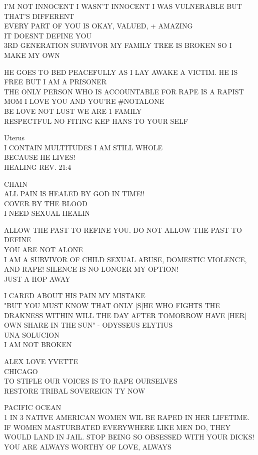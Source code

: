 \documentclass[10pt,letterpaper]{article}
\begin{document}
I'M NOT INNOCENT I WASN'T INNOCENT I WAS VULNERABLE BUT THAT'S DIFFERENT\\
EVERY PART OF YOU IS OKAY, VALUED, + AMAZING\\
IT DOESNT DEFINE YOU\\
3RD GENERATION SURVIVOR MY FAMILY TREE IS BROKEN SO I MAKE MY OWN

HE GOES TO BED PEACEFULLY AS I LAY AWAKE A VICTIM.  HE IS FREE BUT I AM A PRISONER\\
THE ONLY PERSON WHO IS ACCOUNTABLE FOR RAPE IS A RAPIST MOM I LOVE YOU AND YOU'RE \#NOTALONE\\
BE LOVE NOT LUST WE ARE 1 FAMILY\\
RESPECTFUL NO FITING KEP HANS TO YOUR SELF

Uterus\\
I CONTAIN MULTITUDES I AM STILL WHOLE\\
BECAUSE HE LIVES!\\
HEALING REV. 21:4

CHAIN\\
ALL PAIN IS HEALED BY GOD IN TIME!!\\
COVER BY THE BLOOD\\
I NEED SEXUAL HEALIN

ALLOW THE PAST TO REFINE YOU.  DO NOT ALLOW THE PAST TO DEFINE\\
YOU ARE NOT ALONE\\
I AM A SURVIVOR OF CHILD SEXUAL ABUSE, DOMESTIC VIOLENCE, AND RAPE!  SILENCE IS NO LONGER MY OPTION!\\
JUST A HOP AWAY

I CARED ABOUT HIS PAIN MY MISTAKE\\
"BUT YOU MUST KNOW THAT ONLY {[}S{]}HE WHO FIGHTS THE DRAKNESS WITHIN WILL THE DAY AFTER TOMORROW HAVE {[}HER{]} OWN SHARE IN THE SUN" {-} ODYSSEUS ELYTIUS\\
UNA SOLUCION\\
I AM NOT BROKEN

ALEX LOVE YVETTE\\
CHICAGO\\
TO STIFLE OUR VOICES IS TO RAPE OURSELVES\\
RESTORE TRIBAL SOVEREIGN TY NOW

PACIFIC OCEAN\\
1 IN 3 NATIVE AMERICAN WOMEN WIL BE RAPED IN HER LIFETIME.\\
IF WOMEN MASTURBATED EVERYWHERE LIKE MEN DO, THEY WOULD LAND IN JAIL.  STOP BEING SO OBSESSED WITH YOUR DICKS!\\
YOU ARE ALWAYS WORTHY OF LOVE, ALWAYS
\end{document}
